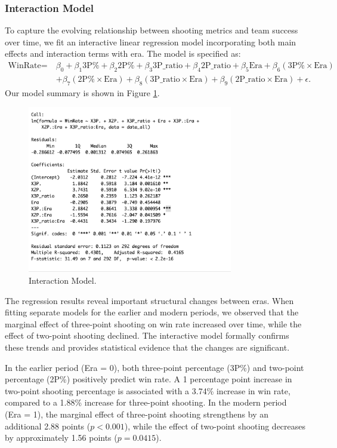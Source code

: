 \documentclass[11pt, a4paper]{article} %
\begin{document}
\subsubsection{Interaction Model}
To capture the evolving relationship between shooting metrics and team success over time, we fit an interactive linear regression model 
incorporating both main effects and interaction terms with era. The model is specified as:
\begin{align*}
    \text{WinRate} =\ & \beta_0 + \beta_1 \text{3P\%} + \beta_2 \text{2P\%} + \beta_3 \text{3P\_ratio} + \beta_4 \text{2P\_ratio} + \beta_5 \text{Era} + \beta_6 (\text{3P\%} \times \text{Era}) \\
    &+ \beta_7 (\text{2P\%} \times \text{Era}) + \beta_8 (\text{3P\_ratio} \times \text{Era}) + \beta_9 (\text{2P\_ratio} \times \text{Era}) + \epsilon.
\end{align*}
Our model summary is shown in Figure \ref{fig:model1}.
\begin{figure}[htbp]
    \centering
    \includegraphics[width=0.8\textwidth]{figure/interative model.png}
    \caption{Interaction Model.}
    \label{fig:model1}
\end{figure}

The regression results reveal important structural changes between eras. When fitting separate models for the earlier and modern periods, 
we observed that the marginal effect of three-point shooting on win rate increased over time, while the effect of two-point shooting declined. 
The interactive model formally confirms these trends and provides statistical evidence that the changes are significant.

In the earlier period (Era = 0), both three-point percentage (3P\%) and two-point percentage (2P\%) positively predict win rate. A 1 
percentage point increase in two-point shooting percentage is associated with a 3.74\% increase in win rate, compared to a 1.88\% increase 
for three-point shooting. In the modern period (Era = 1), the marginal effect of three-point shooting strengthens by an additional 2.88 
points ($p < 0.001$), while the effect of two-point shooting decreases by approximately 1.56 points ($p = 0.0415$). 
\end{document}
